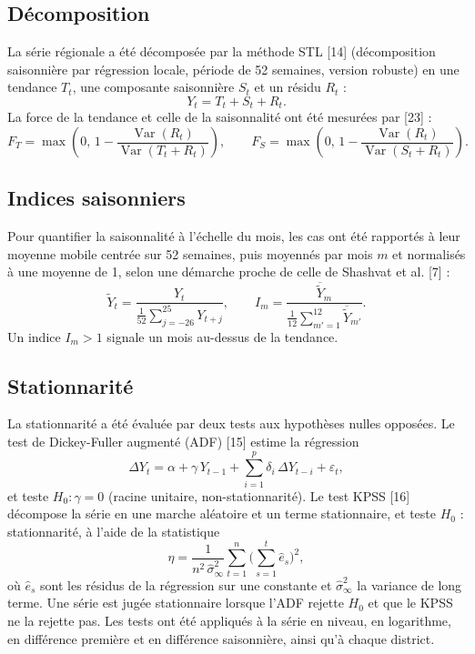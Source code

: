 \documentclass[11pt]{article}
\begin{document}
\subsection{Décomposition}
La série régionale a été décomposée par la méthode STL [14] (décomposition saisonnière par régression locale, période de 52 semaines, version robuste) en une tendance $T_t$, une composante saisonnière $S_t$ et un résidu $R_t$ :
\begin{equation}
Y_t=T_t+S_t+R_t .
\label{eq:stl}
\end{equation}
La force de la tendance et celle de la saisonnalité ont été mesurées par [23] :
\begin{equation}
F_T=\max\!\left(0,\,1-\frac{\operatorname{Var}(R_t)}{\operatorname{Var}(T_t+R_t)}\right),\qquad F_S=\max\!\left(0,\,1-\frac{\operatorname{Var}(R_t)}{\operatorname{Var}(S_t+R_t)}\right).
\label{eq:force}
\end{equation}

\subsection{Indices saisonniers}
Pour quantifier la saisonnalité à l'échelle du mois, les cas ont été rapportés à leur moyenne mobile centrée sur 52 semaines, puis moyennés par mois $m$ et normalisés à une moyenne de 1, selon une démarche proche de celle de Shashvat et al. [7] :
\begin{equation}
\tilde{Y}_t=\frac{Y_t}{\frac{1}{52}\sum_{j=-26}^{25}Y_{t+j}},\qquad I_m=\frac{\overline{\tilde{Y}}_{m}}{\frac{1}{12}\sum_{m'=1}^{12}\overline{\tilde{Y}}_{m'}} .
\label{eq:indice}
\end{equation}
Un indice $I_m>1$ signale un mois au-dessus de la tendance.

\subsection{Stationnarité}
La stationnarité a été évaluée par deux tests aux hypothèses nulles opposées. Le test de Dickey-Fuller augmenté (ADF) [15] estime la régression
\begin{equation}
\Delta Y_t=\alpha+\gamma\,Y_{t-1}+\sum_{i=1}^{p}\delta_i\,\Delta Y_{t-i}+\varepsilon_t ,
\label{eq:adf}
\end{equation}
et teste $H_0:\gamma=0$ (racine unitaire, non-stationnarité). Le test KPSS [16] décompose la série en une marche aléatoire et un terme stationnaire, et teste $H_0$ : stationnarité, à l'aide de la statistique
\begin{equation}
\eta=\frac{1}{n^{2}\,\hat{\sigma}^{2}_{\infty}}\sum_{t=1}^{n}\Big(\sum_{s=1}^{t}\hat{e}_s\Big)^{2},
\label{eq:kpss}
\end{equation}
où $\hat{e}_s$ sont les résidus de la régression sur une constante et $\hat{\sigma}^{2}_{\infty}$ la variance de long terme. Une série est jugée stationnaire lorsque l'ADF rejette $H_0$ et que le KPSS ne la rejette pas. Les tests ont été appliqués à la série en niveau, en logarithme, en différence première et en différence saisonnière, ainsi qu'à chaque district.
\end{document}
